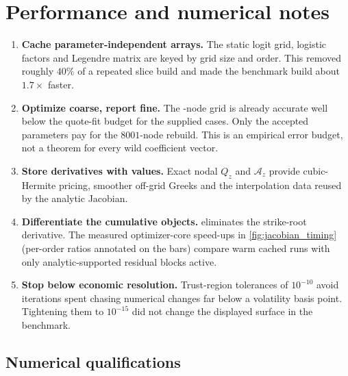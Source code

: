 \documentclass[11pt]{article}
\begin{document}
\section{Performance and numerical notes}
\label{app:performance}

\begin{enumerate}[leftmargin=1.6em]
\item \textbf{Cache parameter-independent arrays.}
The static logit grid, logistic factors and Legendre matrix are keyed by grid
size and order.  This removed roughly $40\%$ of a repeated slice build and made
the benchmark build about $1.7\times$ faster.
\item \textbf{Optimize coarse, report fine.}
The \lqdoptpts-node grid is already accurate well below the quote-fit budget for
the supplied cases.  Only the accepted parameters pay for the $8001$-node
rebuild.  This is an empirical error budget, not a theorem for every wild
coefficient vector.
\item \textbf{Store derivatives with values.}
Exact nodal $Q_z$ and $\mathcal A_z$ provide cubic-Hermite pricing, smoother
off-grid Greeks and the interpolation data reused by the analytic Jacobian.
\item \textbf{Differentiate the cumulative objects.}
 eliminates the strike-root derivative.  The measured
optimizer-core speed-ups in \cref{fig:jacobian_timing} (per-order ratios
annotated on the bars)
compare warm cached runs with only analytic-supported residual blocks active.
\item \textbf{Stop below economic resolution.}
Trust-region tolerances of $10^{-10}$ avoid iterations spent chasing numerical
changes far below a volatility basis point.  Tightening them to $10^{-15}$ did
not change the displayed surface in the benchmark.
\end{enumerate}

\subsection{Numerical qualifications}
\end{document}
